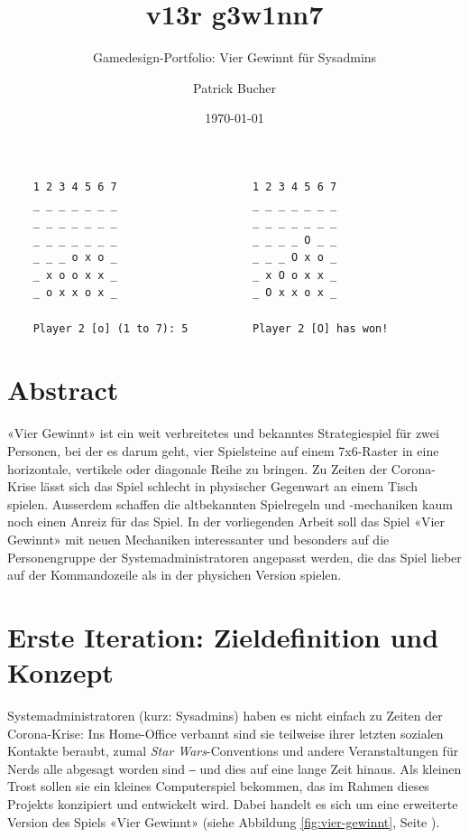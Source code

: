 \documentclass[a4paper,11pt,hidelinks]{scrartcl}
\newcommand{\imgref}[1]{{Abbildung \ref{#1}, Seite \pageref{#1}}}
\begin{document}
\author{Patrick Bucher}
\title{v13r g3w1nn7}
\subtitle{Gamedesign-Portfolio: Vier Gewinnt für Sysadmins}
\date{\today}
\maketitle
\thispagestyle{empty}

\begin{center}
    \begin{lstlisting}
    1 2 3 4 5 6 7                     1 2 3 4 5 6 7
    _ _ _ _ _ _ _                     _ _ _ _ _ _ _
    _ _ _ _ _ _ _                     _ _ _ _ _ _ _
    _ _ _ _ _ _ _                     _ _ _ _ O _ _
    _ _ _ o x o _                     _ _ _ O x o _
    _ x o o x x _                     _ x O o x x _
    _ o x x o x _                     _ O x x o x _

    Player 2 [o] (1 to 7): 5          Player 2 [O] has won!
    \end{lstlisting}
\end{center}

\section*{Abstract}

«Vier Gewinnt» ist ein weit verbreitetes und bekanntes Strategiespiel für zwei Personen, bei der es darum geht, vier Spielsteine auf einem 7x6-Raster in eine horizontale, vertikele oder diagonale Reihe zu bringen. Zu Zeiten der Corona-Krise lässt sich das Spiel schlecht in physischer Gegenwart an einem Tisch spielen. Ausserdem schaffen die altbekannten Spielregeln und -mechaniken kaum noch einen Anreiz für das Spiel. In der vorliegenden Arbeit soll das Spiel «Vier Gewinnt» mit neuen Mechaniken interessanter und besonders auf die Personengruppe der Systemadministratoren angepasst werden, die das Spiel lieber auf der Kommandozeile als in der physichen Version spielen.

\newpage

\tableofcontents
\newpage

\section{Erste Iteration: Zieldefinition und Konzept}

Systemadministratoren (kurz: Sysadmins) haben es nicht einfach zu Zeiten der Corona-Krise: Ins Home-Office verbannt sind sie teilweise ihrer letzten sozialen Kontakte beraubt, zumal \textit{Star Wars}-Conventions und andere Veranstaltungen für Nerds alle abgesagt worden sind ‒ und dies auf eine lange Zeit hinaus. Als kleinen Trost sollen sie ein kleines Computerspiel bekommen, das im Rahmen dieses Projekts konzipiert und entwickelt wird. Dabei handelt es sich um eine erweiterte Version des Spiels «Vier Gewinnt» (siehe \imgref{fig:vier-gewinnt}).
\end{document}
